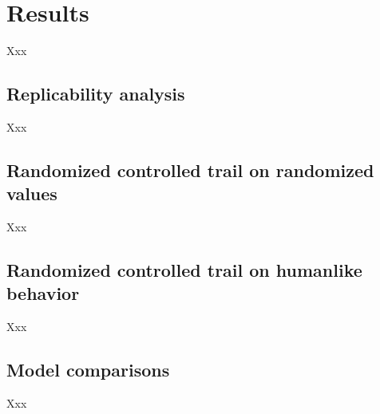 \section{Results}
Xxx

\subsection{Replicability analysis}
Xxx

\subsection{Randomized controlled trail on randomized values}
Xxx

\subsection{Randomized controlled trail on humanlike behavior}
Xxx

\subsection{Model comparisons}
Xxx
